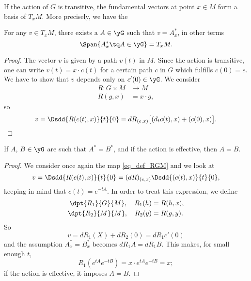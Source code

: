 If the action of $G$ is transitive, the fundamental vectors at point $x\in M$ form a basis of $T_xM$. More precisely, we have the

\begin{lemma}
	For any $v\in T_xM$, there exists a $A\in\yG$ such that $v=A^*_x$, in other terms
	\[
		\Span\{ A^*_{x}\tq A\in\yG \}=T_{x}M.
	\]
	\label{LemFundSpansTan}
\end{lemma}

\begin{proof}
	The vector $v$ is given by a path $v(t)$ in $M$. Since the action is transitive, one can write $v(t)=x\cdot c(t)$ for a certain path $c$ in $G$ which fulfills $c(0)=e$. We have to show that $v$ depends only on $c'(0)\in\yG$. We consider
	\begin{equation}  \label{eq_def_RGM}
		\begin{aligned}
			R\colon G\times M & \to M       \\
			R(g,x)            & = x\cdot g,
		\end{aligned}
	\end{equation}
	so
	\begin{equation}\label{eq:v_Rc}
		v=\Dsdd{ R(c(t),x) }{t}{0}=dR_{(e,x)}\big[  (d_tc(t),x)+(c(0),x)   \big].
	\end{equation}

\end{proof}

\begin{lemma}\label{lem:As_Bs_A_B}
	If $A$, $B\in\yG$ are such that $A^*=B^*$, and if the action is effective, then $A=B$.
\end{lemma}

\begin{proof}
	We consider once again the map \eqref{eq_def_RGM} and we look at
	\[
		v=\Dsdd{ R(c(t),x) }{t}{0}
		=(dR)_{(e,x)}\Dsdd{ (c(t),x) }{t}{0},
	\]
	keeping in mind that $c(t)=e^{-tA}$. In order to treat this expression, we define
	\begin{subequations}
		\begin{align}
			\dpt{R_1}{G}{M},\quad  R_1(h) & =R(h,x), \\
			\dpt{R_2}{M}{M},\quad  R_2(y) & =R(g,y).
		\end{align}
	\end{subequations}
	So
	\[
		v=dR_1(X)+dR_2(0)=dR_1c'(0)
	\]
	and the assumption $A^*_x=B^*_x$ becomes $dR_1 A=dR_1 B$. This makes, for small enough $t$,
	\begin{equation}
		R_1(e^{tA}e^{-tB})=x\cdot e^{tA}e^{-tB}=x;
	\end{equation}
	if the action is effective, it imposes $A=B$.
\end{proof}

